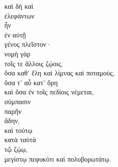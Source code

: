 {\large
\noindent καὶ δὴ καὶ\\
\tabto{2em} ἐλεφάντων \\
ἦν \\
\tabto{2em} ἐν αὐτῇ \\
γένος πλεῖστον· \\
νομὴ γὰρ\\
\tabto{2em} τοῖς τε ἄλλοις ζῴοις, \\
\tabto{4em} ὅσα καθ' ἕλη καὶ λίμνας καὶ ποταμούς, \\
\tabto{4em} ὅσα τ' αὖ κατ' ὄρη \\
\tabto{4em} καὶ ὅσα ἐν τοῖς πεδίοις νέμεται, \\
\tabto{2em} σύμπασιν \\
παρῆν \\
ἅδην, \\
καὶ τούτῳ \\
\tabto{2em} κατὰ ταὐτὰ \\
τῷ ζῴῳ, \\
\tabto{2em} μεγίστῳ πεφυκότι καὶ πολυβορωτάτῳ. \\

}

